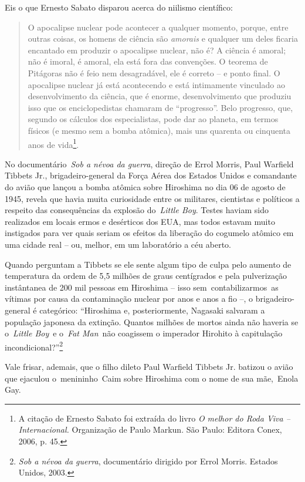 Eis o que Ernesto Sabato disparou acerca do niilismo científico:

\begin{quote}
O apocalipse nuclear pode acontecer a qualquer momento, porque, entre
outras coisas, os homens de ciência são \emph{amorais} e qualquer um
deles ficaria encantado em produzir o apocalipse nuclear, não é? A
ciência é amoral; não é imoral, é amoral, ela está fora das convenções.
O teorema de Pitágoras não é feio nem desagradável, ele é correto -- e
ponto final. O apocalipse nuclear já está acontecendo e está intimamente
vinculado ao desenvolvimento da ciência, que é enorme, desenvolvimento
que produziu isso que os enciclopedistas chamaram de ``progresso''. Belo
progresso, que, segundo os cálculos dos especialistas, pode dar ao
planeta, em termos físicos (e mesmo sem a bomba atômica), mais uns
quarenta ou cinquenta anos de vida\footnote{A citação de Ernesto Sabato
  foi extraída do livro \emph{O melhor do Roda Viva -- Internacional.}
  Organização de Paulo Markun. São Paulo: Editora Conex, 2006, p. 45.}.
\end{quote}

No documentário~\emph{Sob a névoa da guerra}, direção de Errol Morris,
Paul Warfield Tibbets Jr., brigadeiro-general da Força Aérea dos Estados
Unidos e comandante do avião que lançou a bomba atômica sobre Hiroshima
no dia 06 de agosto de 1945, revela que havia muita curiosidade entre os
militares, cientistas e políticos a respeito das consequências da
explosão do~\emph{Little Boy}. Testes haviam sido realizados em locais
ermos e desérticos dos EUA, mas todos estavam muito instigados para ver
quais seriam os efeitos da liberação do cogumelo atômico em uma cidade
real -- ou, melhor, em um laboratório a céu aberto.

Quando perguntam a Tibbets se ele sente algum tipo de culpa pelo aumento
de temperatura da ordem de 5,5 milhões de graus centígrados e pela
pulverização instântanea de 200 mil pessoas em Hiroshima -- isso
sem~contabilizarmos~as vítimas por causa da contaminação nuclear por
anos e anos a fio --, o brigadeiro-general é categórico: ``Hiroshima e,
posteriormente, Nagasaki salvaram a população japonesa da extinção.
Quantos milhões de mortos ainda não haveria se o~\emph{Little Boy}~e
o~\emph{Fat Man}~não coagissem o imperador Hirohito à capitulação
incondicional?''\footnote{\emph{Sob a névoa da guerra}, documentário
  dirigido por Errol Morris. Estados Unidos, 2003.}

Vale frisar, ademais, que o filho dileto Paul Warfield Tibbets Jr.
batizou o avião que ejaculou o~menininho~Caim sobre Hiroshima com o nome
de sua mãe,~Enola Gay.

